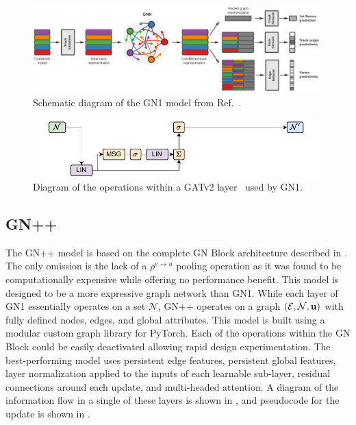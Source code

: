 \begin{figure}[h]
    \centering
    \includegraphics[width=0.99\textwidth]{Figures/cern_atlas/GN1.png}
    \caption{Schematic diagram of the GN1 model from Ref.~\cite{GN1}.}
    \label{fig:gn1}
\end{figure}

\begin{figure}
    \centering
    \includegraphics[width=0.99\textwidth]{figures/flavour_tagging/gn1.pdf}
    \caption{Diagram of the operations within a GATv2 layer~\cite{GATv2} used by GN1.}
    \label{fig:gn1_graph}
\end{figure}

\subsection{GN++}
\label{sec:gnp}

The GN++ model is based on the complete GN Block architecture described in .
The only omission is the lack of a $\rho^{e \to u}$ pooling operation as it was found to be computationally expensive while offering no performance benefit.
This model is designed to be a more expressive graph network than GN1.
While each layer of GN1 essentially operates on a set $\mathcal{N}$, GN++ operates on a graph $(\mathcal{E}, \mathcal{N}, \mathbf{u})$ with fully defined nodes, edges, and global attributes.
This model is built using a modular custom graph library for PyTorch.
Each of the operations within the GN Block could be easily deactivated allowing rapid design experimentation.
The best-performing model uses persistent edge features, persistent global features, layer normalization applied to the inputs of each learnable sub-layer, residual connections around each update, and multi-headed attention.
A diagram of the information flow in a single of these layers is shown in , and pseudocode for the update is shown in .

